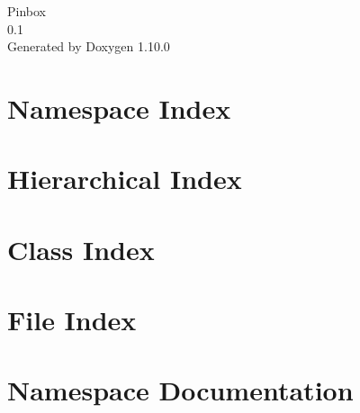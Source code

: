 \documentclass[twoside]{book}
\newcommand{\+}{\discretionary{\mbox{\scriptsize$\hookleftarrow$}}{}{}}
\newcommand{\clearemptydoublepage}{%
    \newpage{\pagestyle{empty}\cleardoublepage}%
  }
\begin{document}
  \raggedbottom
    \hypersetup{pageanchor=false,
                bookmarksnumbered=true,
                pdfencoding=unicode
               }
  \begin{titlepage}
  \vspace*{7cm}
  \begin{center}%
  {\Large Pinbox}\\
  [1ex]\large 0.\+1 \\
  \vspace*{1cm}
  {\large Generated by Doxygen 1.10.0}\\
  \end{center}
  \end{titlepage}
  \clearemptydoublepage
  \tableofcontents
  \clearemptydoublepage
  \hypersetup{pageanchor=true}
\chapter{Namespace Index}

\chapter{Hierarchical Index}

\chapter{Class Index}

\chapter{File Index}

\chapter{Namespace Documentation}

























\end{document}
